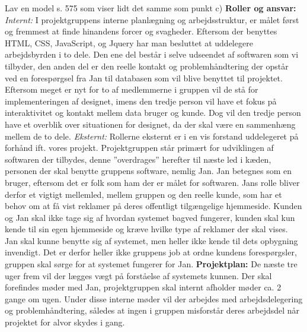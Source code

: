 \documentclass[a4paper,12pt]{article}
\begin{document}
Lav en model s. 575 som viser lidt det samme som punkt c)
\newline
\newline
\textbf{Roller og ansvar:}
\newline
\textit{Internt:}
\newline
I projektgruppens interne planlægning og arbejdsstruktur, er målet først og fremmest at finde hinandens forcer og svagheder. Eftersom der benyttes HTML, CSS, JavaScript, og Jquery har man besluttet at uddelegere arbejdsbyrden i to dele. Den ene del består i selve udseendet af softwaren som vi tilbyder, den anden del er den reelle kontakt og problemhåndtering der opstår ved en forespørgsel fra Jan til databasen som vil blive benyttet til projektet.
Eftersom meget er nyt for to af medlemmerne i gruppen vil de stå for implementeringen af designet, imens den tredje person vil have et fokus på interaktivitet og kontakt mellem data bruger og kunde.
Dog vil den tredje person have et overblik over situationen for designet, da der skal være en sammenhæng mellem de to dele.
\newline
\newline
\textit{Eksternt:}
\newline
Rollerne eksternt er i en vis forstand uddelegeret på forhånd ift. vores projekt. Projektgruppen står primært for udviklingen af softwaren der tilbydes, denne ”overdrages” herefter til næste led i kæden, personen der skal benytte gruppens software, nemlig Jan. 
Jan betegnes som en bruger, eftersom det er folk som ham der er målet for softwaren. Jans rolle bliver derfor et vigtigt mellemled, mellem gruppen og den reelle kunde, som har et behov om at få vist reklamer på deres offentligt tilgængelige hjemmeside.
Kunden og Jan skal ikke tage sig af hvordan systemet bagved fungerer, kunden skal kun kende til sin egen hjemmeside og kræve hvilke type af reklamer der skal vises. Jan skal kunne benytte sig af systemet, men heller ikke kende til dets opbygning invendigt.
Det er derfor heller ikke gruppens job at ordne kundens forespørgsler, gruppen skal sørge for at systemet fungerer for Jan. 
\newline
\newline
\textbf{Projektplan:}
\newline
De næste tre uger frem vil der lægges vægt på forståelse af systemets kunnen. 
Der skal forefindes møder med Jan, projektgruppen skal internt afholder møder ca. 2 gange om ugen. Under disse interne møder vil der arbejdes med arbejdsdelegering og problemhåndtering, således at ingen i gruppen misforstår deres arbejdsdel når projektet for alvor skydes i gang.
\end{document}
